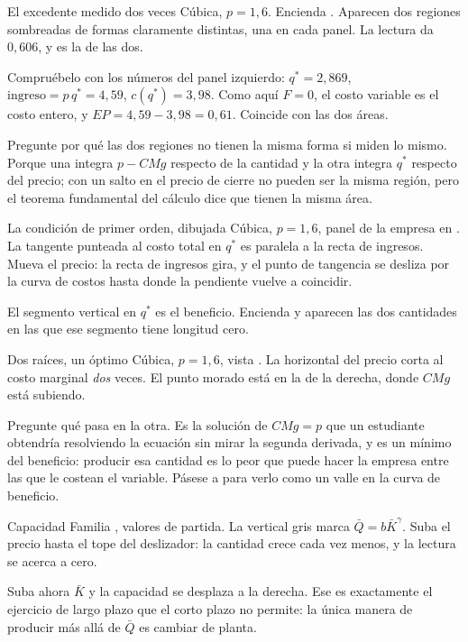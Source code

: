 \documentclass[11pt,a4paper]{appletmanual}
\begin{document}
\begin{activity}{El excedente medido dos veces}
\amset Cúbica, $p = 1{,}6$. Encienda .
\amexp Aparecen dos regiones sombreadas de formas claramente distintas, una en
cada panel. La lectura  da $0{,}606$, y es la de las dos.
\par\smallskip
Compruébelo con los números del panel izquierdo: $q^\ast = 2{,}869$,
$\text{ingreso} = p\,q^\ast = 4{,}59$, $c(q^\ast) = 3{,}98$. Como aquí $F = 0$,
el costo variable es el costo entero, y
$EP = 4{,}59 - 3{,}98 = 0{,}61$. Coincide con las dos áreas.
\par\smallskip
Pregunte por qué las dos regiones no tienen la misma forma si miden lo mismo.
Porque una integra $p - CMg$ respecto de la cantidad y la otra integra $q^\ast$
respecto del precio; con un salto en el precio de cierre no pueden ser la misma
región, pero el teorema fundamental del cálculo dice que tienen la misma área.
\end{activity}

\begin{activity}{La condición de primer orden, dibujada}
\amset Cúbica, $p = 1{,}6$, panel de la empresa en .
\amexp La tangente punteada al costo total en $q^\ast$ es paralela a la recta
de ingresos. Mueva el precio: la recta de ingresos gira, y el punto de
tangencia se desliza por la curva de costos hasta donde la pendiente vuelve a
coincidir.
\par\smallskip
El segmento vertical en $q^\ast$ es el beneficio. Encienda  y aparecen las dos cantidades en las que ese segmento tiene
longitud cero.
\end{activity}

\begin{activity}{Dos raíces, un óptimo}
\amset Cúbica, $p = 1{,}6$, vista .
\amexp La horizontal del precio corta al costo marginal \emph{dos} veces. El
punto morado está en la de la derecha, donde $CMg$ está subiendo.
\par\smallskip
Pregunte qué pasa en la otra. Es la solución de $CMg = p$ que un estudiante
obtendría resolviendo la ecuación sin mirar la segunda derivada, y es un mínimo
del beneficio: producir esa cantidad es lo peor que puede hacer la empresa
entre las que le costean el variable. Pásese a  para verlo como un
valle en la curva de beneficio.
\end{activity}

\begin{activity}{Capacidad}
\amset Familia , valores de partida.
\amexp La vertical gris marca $\bar Q = b\bar K^{\gamma}$. Suba el precio hasta
el tope del deslizador: la cantidad crece cada vez menos, y la lectura
 se acerca a cero.
\par\smallskip
Suba ahora $\bar K$ y la capacidad se desplaza a la derecha. Ese es exactamente
el ejercicio de largo plazo que el corto plazo no permite: la única manera de
producir más allá de $\bar Q$ es cambiar de planta.
\end{activity}
\end{document}

